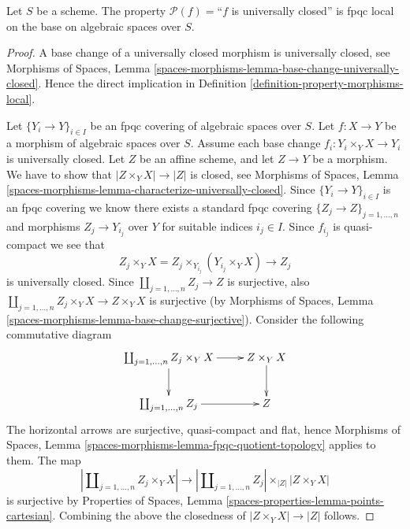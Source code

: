\begin{lemma}
\label{lemma-descending-property-universally-closed}
Let $S$ be a scheme.
The property $\mathcal{P}(f) =$``$f$ is universally closed''
is fpqc local on the base on algebraic spaces over $S$.
\end{lemma}

\begin{proof}
A base change of a universally closed morphism is universally closed, see
Morphisms of Spaces,
Lemma \ref{spaces-morphisms-lemma-base-change-universally-closed}.
Hence the direct implication in
Definition \ref{definition-property-morphisms-local}.

\medskip\noindent
Let $\{Y_i \to Y\}_{i \in I}$ be an fpqc covering of algebraic spaces over $S$.
Let $f : X \to Y$ be a morphism of algebraic spaces over $S$.
Assume each base change $f_i : Y_i \times_Y X \to Y_i$ is universally closed.
Let $Z$ be an affine scheme, and let $Z \to Y$ be a morphism.
We have to show that $|Z \times_Y X| \to |Z|$ is closed, see
Morphisms of Spaces,
Lemma \ref{spaces-morphisms-lemma-characterize-universally-closed}.
Since $\{Y_i \to Y\}_{i \in I}$ is an fpqc covering we know there
exists a standard fpqc covering $\{Z_j \to Z\}_{j = 1, \ldots , n}$
and morphisms $Z_j \to Y_{i_j}$ over $Y$ for suitable indices $i_j \in I$.
Since $f_{i_j}$ is quasi-compact we see that
$$
Z_j \times_Y X
=
Z_j \times_{Y_{i_j}} (Y_{i_j} \times_Y X)
\longrightarrow
Z_j
$$
is universally closed.
Since $\coprod_{j = 1, \ldots, n} Z_j \to Z$ is surjective,
also $\coprod_{j = 1, \ldots, n} Z_j \times_Y X \to Z \times_Y X$ is
surjective (by
Morphisms of Spaces,
Lemma \ref{spaces-morphisms-lemma-base-change-surjective}).
Consider the following commutative diagram
$$
\xymatrix{
\coprod_{j = 1, \ldots, n} Z_j \times_Y X \ar[d] \ar[r] &
Z \times_Y X \ar[d] \\
\coprod_{j = 1, \ldots, n} Z_j \ar[r] &
Z
}
$$
The horizontal arrows are surjective, quasi-compact and flat, hence
Morphisms of Spaces, Lemma \ref{spaces-morphisms-lemma-fpqc-quotient-topology}
applies to them. The map
$$
\left|\coprod\nolimits_{j = 1, \ldots, n} Z_j \times_Y X\right|
\longrightarrow
\left|\coprod\nolimits_{j = 1, \ldots, n} Z_j\right|
\times_{|Z|}
|Z \times_Y X|
$$
is surjective by
Properties of Spaces, Lemma \ref{spaces-properties-lemma-points-cartesian}.
Combining the above the closedness of $|Z \times_Y X| \to |Z|$ follows.
\end{proof}












